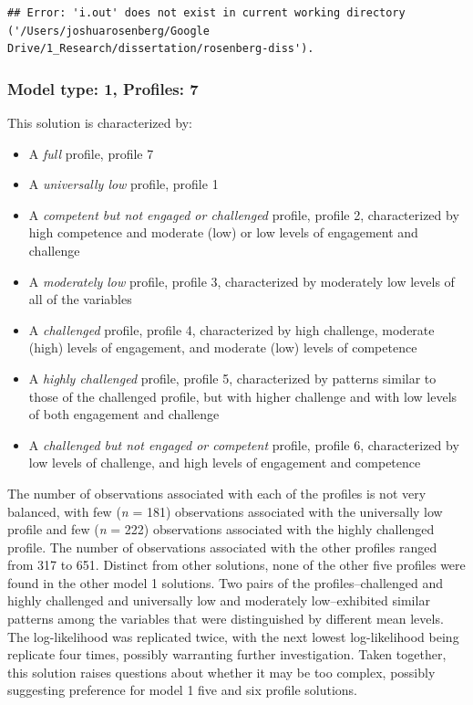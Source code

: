\documentclass[]{msu-thesis}
\providecommand{\tightlist}{%
  \setlength{\itemsep}{0pt}\setlength{\parskip}{0pt}}
\theoremstyle{definition}
\theoremstyle{definition}
\theoremstyle{definition}
\theoremstyle{remark}
\begin{document}
\begin{verbatim}
## Error: 'i.out' does not exist in current working directory ('/Users/joshuarosenberg/Google Drive/1_Research/dissertation/rosenberg-diss').
\end{verbatim}

\subsubsection{Model type: 1, Profiles:
7}\label{model-type-1-profiles-7}

This solution is characterized by:

\begin{itemize}
\tightlist
\item
  A \emph{full} profile, profile 7
\item
  A \emph{universally low} profile, profile 1
\item
  A \emph{competent but not engaged or challenged} profile, profile 2,
  characterized by high competence and moderate (low) or low levels of
  engagement and challenge
\item
  A \emph{moderately low} profile, profile 3, characterized by
  moderately low levels of all of the variables
\item
  A \emph{challenged} profile, profile 4, characterized by high
  challenge, moderate (high) levels of engagement, and moderate (low)
  levels of competence
\item
  A \emph{highly challenged} profile, profile 5, characterized by
  patterns similar to those of the challenged profile, but with higher
  challenge and with low levels of both engagement and challenge
\item
  A \emph{challenged but not engaged or competent} profile, profile 6,
  characterized by low levels of challenge, and high levels of
  engagement and competence
\end{itemize}

The number of observations associated with each of the profiles is not
very balanced, with few (\emph{n} = 181) observations associated with
the universally low profile and few (\emph{n} = 222) observations
associated with the highly challenged profile. The number of
observations associated with the other profiles ranged from 317 to 651.
Distinct from other solutions, none of the other five profiles were
found in the other model 1 solutions. Two pairs of the
profiles--challenged and highly challenged and universally low and
moderately low--exhibited similar patterns among the variables that were
distinguished by different mean levels. The log-likelihood was
replicated twice, with the next lowest log-likelihood being replicate
four times, possibly warranting further investigation. Taken together,
this solution raises questions about whether it may be too complex,
possibly suggesting preference for model 1 five and six profile
solutions.
\end{document}
